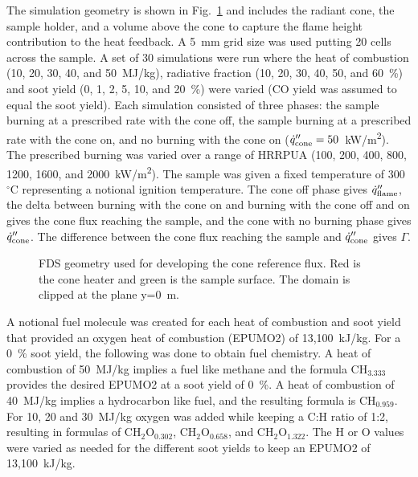 The simulation geometry is shown in Fig.~\ref{fig:cone_ref_geom} and includes the radiant cone, the sample holder, and a volume above the cone to capture the flame height contribution to the heat feedback. A 5~mm grid size was used putting 20 cells across the sample. A set of 30 simulations were run where the heat of combustion (10, 20, 30, 40, and 50~\unit{MJ/kg}), radiative fraction (10, 20, 30, 40, 50, and 60~\%) and soot yield (0, 1, 2, 5, 10, and 20~\%) were varied (CO yield was assumed to equal the soot yield). Each simulation consisted of three phases: the sample burning at a prescribed rate with the cone off, the sample burning at a prescribed rate with the cone on, and no burning with the cone on ($\dot{q}_{\rm cone}''=50$~\unit{kW/m^2}). The prescribed burning was varied over a range of HRRPUA (100, 200, 400, 800, 1200, 1600, and 2000~\unit{kW/m^2}). The sample was given a fixed temperature of 300~$^\circ$C representing a notional ignition temperature. The cone off phase gives
$\dot{q}_{\rm flame}''$, the delta between burning with the cone on and burning with the cone off and on gives the cone flux reaching the sample, and the cone with no burning phase gives $\dot{q}_{\rm cone}''$. The difference between the cone flux reaching the sample and $\dot{q}_{\rm cone}''$ gives $\Gamma$.

\begin{figure}
    \begin{center}
        \caption[FDS geometry used for developing the cone reference flux]{\label{fig:cone_ref_geom} FDS geometry used for developing the cone reference flux. Red is the cone heater and green is the sample surface. The domain is clipped at the plane y=0~m.}
    \end{center}
\end{figure}

A notional fuel molecule was created for each heat of combustion and soot yield that provided an oxygen heat of combustion (EPUMO2) of 13,100~\unit{kJ/kg}. For a 0~\% soot yield, the following was done to obtain fuel chemistry. A heat of combustion of 50~\unit{MJ/kg} implies a fuel like methane and the formula CH$_{3.333}$ provides the desired EPUMO2 at a soot yield of 0~\%. A heat of combustion of 40~\unit{MJ/kg} implies a hydrocarbon like fuel, and the resulting formula is CH$_{0.959}$. For 10, 20 and 30~\unit{MJ/kg} oxygen was added while keeping a C:H ratio of 1:2, resulting in formulas of CH$_{2}$O$_{0.302}$, CH$_{2}$O$_{0.658}$, and CH$_{2}$O$_{1.322}$. The H or O values were varied as needed for the different soot yields to keep an EPUMO2 of 13,100~\unit{kJ/kg}.

